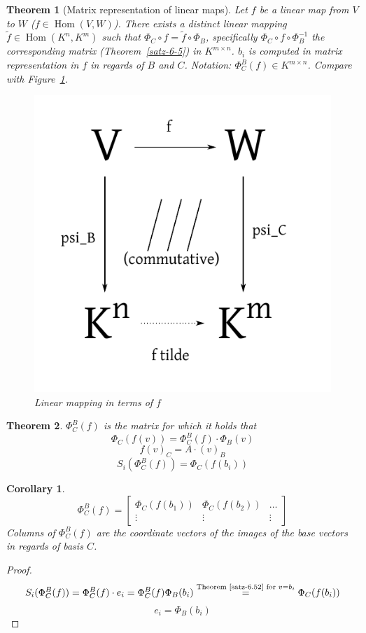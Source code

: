 \documentclass[a4paper,landscape,twocolumn]{article}
\newtheorem{theorem}{Theorem}
\newtheorem{cor}{Corollary}
\DeclareMathOperator\Hom{Hom} %
\begin{document}
\begin{theorem}[Matrix representation of linear maps]
  Let $f$ be a linear map from $V$ to $W$ ($f \in \Hom(V, W)$).
  There exists a distinct linear mapping $\tilde{f} \in \Hom(K^n,K^m)$
  such that $\Phi_C \circ f = \tilde{f} \circ \Phi_B$, specifically
  $\Phi_C \circ f \circ \Phi_B^{-1}$ the corresponding matrix (Theorem~\ref{satz-6-5})
  in $K^{m\times n}$.
  $b_i$ is computed in matrix representation in $f$ in regards of $B$ and $C$.
  Notation: $\Phi_C^B(f) \in K^{m\times n}$.
  Compare with Figure~\ref{img:lm}.
  \begin{figure}[t]
    \begin{center}
      \includegraphics{img/linear_mapping.pdf}
      \caption{Linear mapping in terms of $f$}
      \label{img:lm}
    \end{center}
  \end{figure}
\end{theorem}

\begin{theorem}
  \label{satz-6.52}
  $\Phi_C^B(f)$ is the matrix for which it holds that
  \[ \Phi_C(f(v)) = \Phi_C^B(f) \cdot \Phi_B(v) \]
  \[ f(v)_C = A \cdot (v)_B \]
  \[ S_i(\Phi_C^B(f)) = \Phi_C(f(b_i)) \]
\end{theorem}

\begin{cor}
  \label{corollary-6.53}
  \[
    \Phi_C^B(f) =
    \begin{bmatrix}
      \Phi_C(f(b_1)) & \Phi_C(f(b_2)) & \ldots \\
      \vdots & \vdots & \vdots
    \end{bmatrix}
  \]
  Columns of $\Phi_C^B(f)$ are the coordinate vectors of the images of the base vectors in regards of basis $C$.
\end{cor}
\begin{proof}
  \[
    S_i(\Phi_C^B(f))
    = \Phi_C^B(f) \cdot e_i
    = \Phi_C^B(f) \Phi_B(b_i)
    \overset{\text{Theorem~\ref{satz-6.52} for } v = b_i}{=} \Phi_C(f(b_i))
  \] \[
    e_i = \Phi_B(b_i)
  \]
\end{proof}
\end{document}
